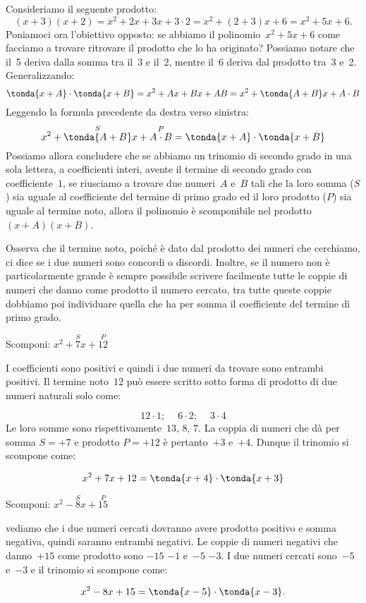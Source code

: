 Consideriamo il seguente prodotto:
\[(x+3)(x+2)=x^2+2x+3x+3 \cdot 2=x^2+(2+3)x+6=x^2+5x+6.\]
Poniamoci ora l'obiettivo opposto: se abbiamo il
polinomio~\(x^2+5x+6\) come facciamo a trovare ritrovare il prodotto
che lo ha originato? Possiamo notare che il~5 deriva dalla somma tra
il~3 e il~2, mentre il~6 deriva dal prodotto tra~3 e~2. Generalizzando:
\[\tonda{x+A}\cdot \tonda{x+B}=
  x^{{2}}+Ax+Bx+AB=x^2+\tonda{A+B}x+A\cdot B\]
Leggendo la formula precedente da destra verso sinistra:
\[x^{{2}}+\overset{S}{\tonda{A+B}}x+\overset{P}{A \cdot B}
=\tonda{x+A}\cdot\tonda{x+B}\]
Possiamo allora concludere che se abbiamo un trinomio di secondo grado
in una sola lettera, a coefficienti interi, avente il termine di
secondo grado con coefficiente~\(1\), se riusciamo a trovare due numeri~\(A\) 
e~\(B\) tali che la loro somma (\(S\)) sia uguale al
coefficiente del termine di primo grado ed il loro prodotto (\(P\)) sia 
uguale al termine noto, allora il polinomio è scomponibile nel 
prodotto~\((x+A)(x+B)\).

Osserva che il termine noto, poiché è dato dal prodotto dei numeri
che cerchiamo, ci dice se i due numeri sono concordi o discordi.
Inoltre, se il numero non è particolarmente grande è sempre
possibile scrivere facilmente tutte le coppie di numeri che danno come
prodotto il numero cercato, tra tutte queste coppie dobbiamo poi
individuare quella che ha per somma il coefficiente del termine di
primo grado.

\begin{esempio}{}{}
Scomponi: \(x^2+\overset{S}{7}x+\overset{P}{12}\)

I coefficienti sono positivi e quindi i due numeri da trovare sono
entrambi positivi.
Il termine noto~\(12\) può essere scritto sotto forma di prodotto di due
numeri naturali solo come:

\vspace{-1.0em}
\[12\cdot 1;\quad~6\cdot 2;\quad~3\cdot 4\]
Le loro somme sono rispettivamente~\(13\), \(8\), \(7\). 
La coppia di numeri che dà per somma \(S=+7\) e prodotto \(P=+12\) è 
pertanto~\(+3\) e~\(+4\). 
Dunque il trinomio si scompone come:

\vspace{-1.0em}
\[x^2+7x+12=\tonda{x+4} \cdot \tonda{x+3}\]
\end{esempio}

\begin{esempio}{}{}
Scomponi: \(x^2-\overset{S}{8}x+\overset{P}{15}\)

vediamo che i due numeri cercati dovranno avere 
prodotto positivo e somma negativa, quindi saranno entrambi negativi. 
Le coppie di numeri negativi che danno~\(+15\) come prodotto sono \(-15\) 
\(-1\) e~\(-5\) \(-3\).
I due numeri cercati sono~\(-5\) e~\(-3\) e il trinomio si scompone come:

\vspace{-1.0em}
\[x^2-8x+15=\tonda{x-5}\cdot \tonda{x-3}.\]
\end{esempio}

